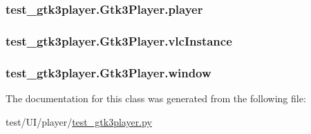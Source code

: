 \subsubsection[{player}]{\setlength{\rightskip}{0pt plus 5cm}test\+\_\+gtk3player.\+Gtk3\+Player.\+player}\label{classtest__gtk3player_1_1Gtk3Player_aaa28c1539eeb9bff3640043070ddb3cb}
\hypertarget{classtest__gtk3player_1_1Gtk3Player_a16f08897aa9bb77848d7dcaafc5abd63}{}
\subsubsection[{vlc\+Instance}]{\setlength{\rightskip}{0pt plus 5cm}test\+\_\+gtk3player.\+Gtk3\+Player.\+vlc\+Instance}\label{classtest__gtk3player_1_1Gtk3Player_a16f08897aa9bb77848d7dcaafc5abd63}
\hypertarget{classtest__gtk3player_1_1Gtk3Player_aae28e9f639761f39b771870b77e81aa9}{}
\subsubsection[{window}]{\setlength{\rightskip}{0pt plus 5cm}test\+\_\+gtk3player.\+Gtk3\+Player.\+window}\label{classtest__gtk3player_1_1Gtk3Player_aae28e9f639761f39b771870b77e81aa9}


The documentation for this class was generated from the following file\+:\begin{DoxyCompactItemize}
\item 
test/\+U\+I/player/\hyperlink{test__gtk3player_8py}{test\+\_\+gtk3player.\+py}\end{DoxyCompactItemize}
